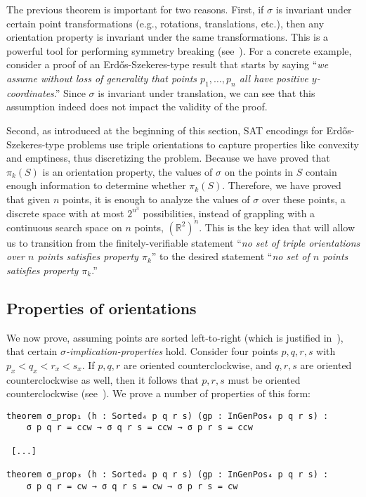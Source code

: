 The previous theorem is important for two reasons.
First, if $\sigma$ is invariant under certain point transformations (e.g., rotations, translations, etc.),
then any orientation property is invariant under the same transformations.
This is a powerful tool for performing symmetry breaking (see~).
For a concrete example, consider a proof of an Erd\H{o}s-Szekeres-type result that starts by saying ``\emph{we assume without loss of generality that points $p_1, \ldots, p_n$ all have positive $y$-coordinates}.''
Since $\sigma$ is invariant under translation, we can see that this assumption indeed does not impact the validity of the proof.

Second,
as introduced at the beginning of this section,
SAT encodings for Erd\H{o}s-Szekeres-type problems use triple orientations to capture properties like convexity and emptiness,
thus discretizing the problem.
Because we have proved that $\pi_k(S)$ is an orientation property,
the values of $\sigma$ on the points in $S$ contain enough information to determine whether $\pi_k(S)$.
Therefore, we have proved that given $n$ points,
it is enough to analyze the values of $\sigma$ over these points,
a discrete space with at most $2^{n^3}$ possibilities,
instead of grappling with a continuous search space on $n$ points,
$\left(\mathbb{R}^2\right)^n$.
This is the key idea that will allow us to transition from the finitely-verifiable statement ``\emph{no set of triple orientations over $n$ points satisfies property $\pi_k$}'' to the desired statement ``\emph{no set of $n$ points satisfies property $\pi_k$}.''

\subsection{Properties of orientations}\label{sec:sigma-props}

We now prove,
assuming points are sorted left-to-right (which is justified in~),
that certain \emph{$\sigma$-implication-properties} hold.
Consider four points $p, q, r, s$ with $p_x < q_x < r_x < s_x$.
If $p, q, r$ are oriented counterclockwise,
and $q, r, s$ are oriented counterclockwise as well,
then it follows that $p, r, s$ must be oriented counterclockwise
(see~).
We prove a number of properties of this form:

\begin{lstlisting}
theorem σ_prop₁ (h : Sorted₄ p q r s) (gp : InGenPos₄ p q r s) :
    σ p q r = ccw → σ q r s = ccw → σ p r s = ccw

 [...]

theorem σ_prop₃ (h : Sorted₄ p q r s) (gp : InGenPos₄ p q r s) :
    σ p q r = cw → σ q r s = cw → σ p r s = cw
\end{lstlisting}

